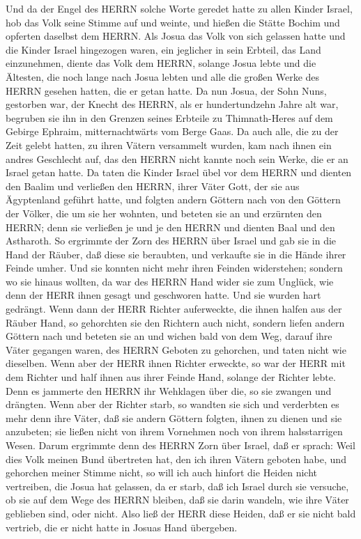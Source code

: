  Und da der Engel des HERRN solche Worte geredet hatte zu
allen Kinder Israel, hob das Volk seine Stimme auf und weinte,
 und hießen die Stätte Bochim und opferten daselbst dem
HERRN.  Als Josua das Volk von sich gelassen hatte und die
Kinder Israel hingezogen waren, ein jeglicher in sein Erbteil, das Land
einzunehmen,  diente das Volk dem HERRN, solange Josua lebte
und die Ältesten, die noch lange nach Josua lebten und alle die großen
Werke des HERRN gesehen hatten, die er getan hatte.  Da nun
Josua, der Sohn Nuns, gestorben war, der Knecht des HERRN, als er
hundertundzehn Jahre alt war,  begruben sie ihn in den
Grenzen seines Erbteile zu Thimnath-Heres auf dem Gebirge Ephraim,
mitternachtwärts vom Berge Gaas.  Da auch alle, die zu der
Zeit gelebt hatten, zu ihren Vätern versammelt wurden, kam nach ihnen
ein andres Geschlecht auf, das den HERRN nicht kannte noch sein Werke,
die er an Israel getan hatte.  Da taten die Kinder Israel
übel vor dem HERRN und dienten den Baalim  und verließen
den HERRN, ihrer Väter Gott, der sie aus Ägyptenland geführt hatte, und
folgten andern Göttern nach von den Göttern der Völker, die um sie her
wohnten, und beteten sie an und erzürnten den HERRN;  denn
sie verließen je und je den HERRN und dienten Baal und den Astharoth.
 So ergrimmte der Zorn des HERRN über Israel und gab sie in
die Hand der Räuber, daß diese sie beraubten, und verkaufte sie in die
Hände ihrer Feinde umher. Und sie konnten nicht mehr ihren Feinden
widerstehen;  sondern wo sie hinaus wollten, da war des
HERRN Hand wider sie zum Unglück, wie denn der HERR ihnen gesagt und
geschworen hatte. Und sie wurden hart gedrängt.  Wenn dann
der HERR Richter auferweckte, die ihnen halfen aus der Räuber Hand,
 so gehorchten sie den Richtern auch nicht, sondern liefen
andern Göttern nach und beteten sie an und wichen bald von dem Weg,
darauf ihre Väter gegangen waren, des HERRN Geboten zu gehorchen, und
taten nicht wie dieselben.  Wenn aber der HERR ihnen
Richter erweckte, so war der HERR mit dem Richter und half ihnen aus
ihrer Feinde Hand, solange der Richter lebte. Denn es jammerte den HERRN
ihr Wehklagen über die, so sie zwangen und drängten.  Wenn
aber der Richter starb, so wandten sie sich und verderbten es mehr denn
ihre Väter, daß sie andern Göttern folgten, ihnen zu dienen und sie
anzubeten; sie ließen nicht von ihrem Vornehmen noch von ihrem
halsstarrigen Wesen.  Darum ergrimmte denn des HERRN Zorn
über Israel, daß er sprach: Weil dies Volk meinen Bund übertreten hat,
den ich ihren Vätern geboten habe, und gehorchen meiner Stimme nicht,
 so will ich auch hinfort die Heiden nicht vertreiben, die
Josua hat gelassen, da er starb,  daß ich Israel durch sie
versuche, ob sie auf dem Wege des HERRN bleiben, daß sie darin wandeln,
wie ihre Väter geblieben sind, oder nicht.  Also ließ der
HERR diese Heiden, daß er sie nicht bald vertrieb, die er nicht hatte in
Josuas Hand übergeben.

